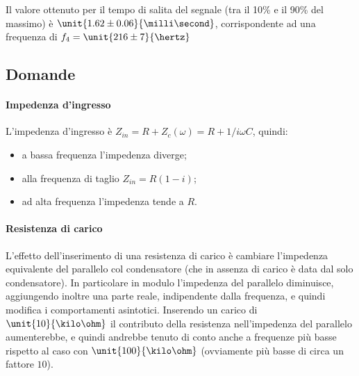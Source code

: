 \documentclass[10pt,a4paper]{article}
\begin{document}
Il valore ottenuto per il tempo di salita del segnale (tra il 10\% e il 90\% del massimo) è $\unit{1.62 \pm 0.06}{\milli\second}$, corrispondente ad una frequenza di $f_4 = \unit{216 \pm 7}{\hertz}$

\subsection{Domande}

\paragraph{Impedenza d'ingresso} L'impedenza d'ingresso è $Z_{in} = R + Z_c(\omega) = R + 1/i\omega C$, quindi:
\begin{itemize}
\item a bassa frequenza l'impedenza diverge;
\item alla frequenza di taglio $Z_{in} = R(1-i)$;
\item ad alta frequenza l'impedenza tende a $R$.
\end{itemize}

\paragraph{Resistenza di carico} L'effetto dell'inserimento di una resistenza di carico è cambiare l'impedenza equivalente del parallelo col condensatore (che in assenza di carico è data dal solo condensatore). In particolare in modulo l'impedenza del parallelo diminuisce, aggiungendo inoltre una parte reale, indipendente dalla frequenza, e quindi modifica i comportamenti asintotici.
Inserendo un carico di $\unit{10}{\kilo\ohm}$ il contributo della resistenza nell'impedenza del parallelo aumenterebbe, e quindi andrebbe tenuto di conto anche a frequenze più basse rispetto al caso con $\unit{100}{\kilo\ohm}$ (ovviamente più basse di circa un fattore $10$).
\end{document}
